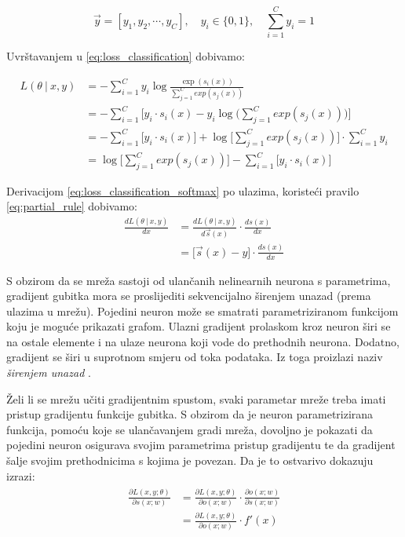 \documentclass[times, utf8, numeric, diplomski]{fer}
\def\pfrac#1#2{\frac{\partial #1}{\partial #2}}
\def\dfrac#1#2{\frac{d #1}{d #2}}
\def\probsep{\ |\ }
\begin{document}
\begin{equation}
\label{eq:onehot}
\vec{y}=[y_1, y_2, \cdots, y_C], \quad y_i \in \{0,1\}, \quad \sum_{i=1}^C y_i = 1
\end{equation}

Uvrštavanjem u \eqref{eq:loss_classification} dobivamo:

\begin{align}
\label{eq:loss_classification_softmax}
L(\theta \probsep x,y) &= - \sum_{i=1}^C y_i \log \frac{\exp(s_i(x))}{\sum_{j=1}^{C} exp(s_j(x))} \nonumber \\
&= - \sum_{i=1}^C \bigg[ y_i \cdot s_i(x) - y_i \log\big(\sum_{j=1}^{C} exp(s_j(x))\big) \bigg] \nonumber \\
&= - \sum_{i=1}^C \big[ y_i \cdot s_i(x) \big] + \log\big[\sum_{j=1}^{C} exp(s_j(x))\big] \cdot \sum_{i=1}^C y_i \nonumber \\
&= \log\big[\sum_{j=1}^{C} exp(s_j(x))\big] - \sum_{i=1}^C \big[ y_i \cdot s_i(x) \big]
\end{align}

Derivacijom \eqref{eq:loss_classification_softmax} po ulazima, koristeći pravilo \eqref{eq:partial_rule} dobivamo:
\begin{align}
\label{eq:loss_classification_softmax_deriv}
\dfrac{L(\theta \probsep x,y)}{x} &= \dfrac{L(\theta \probsep x,y)}{\vec{s}(x)} \cdot \dfrac{s(x)}{x} \nonumber \\
&= \bigg[ \vec{s}(x) - y \bigg] \cdot \dfrac{s(x)}{x}
\end{align}

S obzirom da se mreža sastoji od ulančanih nelinearnih neurona s parametrima, gradijent gubitka mora se proslijediti sekvencijalno širenjem unazad (prema ulazima u mrežu). Pojedini neuron može se smatrati parametriziranom funkcijom koju je moguće prikazati grafom. Ulazni gradijent prolaskom kroz neuron širi se na ostale elemente i na ulaze neurona koji vode do prethodnih neurona. Dodatno, gradijent se širi u suprotnom smjeru od toka podataka. Iz toga proizlazi naziv \textit{širenjem unazad} .

Želi li se mrežu učiti gradijentnim spustom, svaki parametar mreže treba imati pristup gradijentu funkcije gubitka. S obzirom da je neuron parametrizirana funkcija, pomoću koje se ulančavanjem gradi mreža, dovoljno je pokazati da pojedini neuron osigurava svojim parametrima pristup gradijentu te da gradijent šalje svojim prethodnicima s kojima je povezan. Da je to ostvarivo dokazuju izrazi:
\begin{align}
\label{eq:backprop_activation}
\begin{split}
\pfrac{L(x,y;\theta)}{s(x;w)} &= \pfrac{L(x,y;\theta)}{o(x;w)} \cdot \pfrac{o(x;w)}{s(x;w)} \\
&= \pfrac{L(x,y;\theta)}{o(x;w)} \cdot f'(x)
\end{split}
\end{align}
\end{document}

